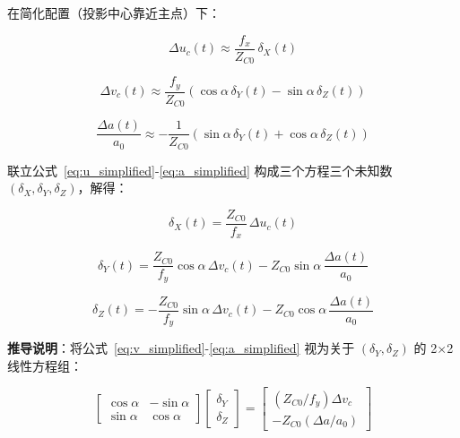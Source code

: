 \documentclass[12pt,a4paper]{article}
\begin{document}
在简化配置（投影中心靠近主点）下：

\begin{equation}
\Delta u_c(t) \approx \frac{f_x}{Z_{C0}} \,\delta_X(t)
\label{eq:u_simplified}
\end{equation}

\begin{equation}
\Delta v_c(t) \approx \frac{f_y}{Z_{C0}} \left(\cos\alpha \, \delta_Y(t) - \sin\alpha \, \delta_Z(t)\right)
\label{eq:v_simplified}
\end{equation}

\begin{equation}
\frac{\Delta a(t)}{a_0} \approx -\frac{1}{Z_{C0}} \left(\sin\alpha \, \delta_Y(t) + \cos\alpha \, \delta_Z(t)\right)
\label{eq:a_simplified}
\end{equation}

联立公式~\eqref{eq:u_simplified}-\eqref{eq:a_simplified} 构成三个方程三个未知数 $(\delta_X, \delta_Y, \delta_Z)$，解得：

\begin{equation}
\boxed{
\delta_X(t) = \frac{Z_{C0}}{f_x} \, \Delta u_c(t)
}
\label{eq:delta_X}
\end{equation}

\begin{equation}
\boxed{
\delta_Y(t) = \frac{Z_{C0}}{f_y} \cos\alpha \, \Delta v_c(t)
- Z_{C0} \sin\alpha \, \frac{\Delta a(t)}{a_0}
}
\label{eq:delta_Y}
\end{equation}

\begin{equation}
\boxed{
\delta_Z(t) = -\frac{Z_{C0}}{f_y} \sin\alpha \, \Delta v_c(t)
- Z_{C0} \cos\alpha \, \frac{\Delta a(t)}{a_0}
}
\label{eq:delta_Z}
\end{equation}

\textbf{推导说明}：将公式~\eqref{eq:v_simplified}-\eqref{eq:a_simplified} 视为关于 $(\delta_Y, \delta_Z)$ 的 2×2 线性方程组：

\begin{equation}
\begin{bmatrix}
\cos\alpha & -\sin\alpha \\
\sin\alpha & \cos\alpha
\end{bmatrix}
\begin{bmatrix} \delta_Y \\ \delta_Z \end{bmatrix}
=
\begin{bmatrix}
(Z_{C0}/f_y) \Delta v_c \\
-Z_{C0} (\Delta a / a_0)
\end{bmatrix}
\label{eq:linear_system}
\end{equation}
\end{document}
